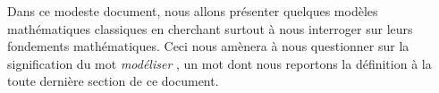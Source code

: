 Dans ce modeste document, nous allons présenter quelques modèles mathématiques classiques en cherchant surtout à nous interroger sur leurs fondements mathématiques. Ceci nous amènera à nous questionner sur la signification du mot \emph{\og modéliser \fg{}} , un mot dont nous reportons la définition à la toute dernière section de ce document.
